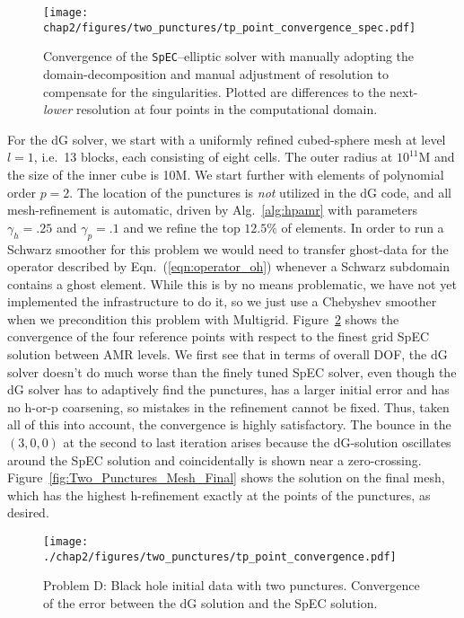  \begin{figure}[ht!]
    \centering
\texttt{[image: chap2/figures/two\_punctures/tp\_point\_convergence\_spec.pdf]}
\caption{
  \label{fig:spec_point_convergence}
  Convergence of the \texttt{SpEC}--elliptic solver with manually
  adopting the domain-decomposition and manual adjustment of
  resolution to compensate for the singularities. Plotted are differences to the
  next-\emph{lower} resolution at four points in the computational domain. }
\end{figure}

For the dG solver, we start with a uniformly refined cubed-sphere mesh
at level $l=1$, i.e.\ 13 blocks, each consisting of eight cells.  The  outer radius at $10^{11}$M and the size of the inner cube is 10M.  We start further with elements of  polynomial
order $p=2$.  The location of the punctures is \textit{not} utilized in the dG code, and all mesh-refinement is automatic, driven by Alg.~\ref{alg:hpamr}  with parameters $\gamma_h = .25$ and $\gamma_p = .1$ and we refine the top $12.5\%$ of elements. In order
to run a Schwarz smoother for this problem we would need to transfer
ghost-data for the operator described by Eqn.~(\ref{eqn:operator_oh})
whenever a Schwarz subdomain contains a ghost element. While this is
by no means problematic, we have not yet implemented the
infrastructure to do it, so we just use a Chebyshev smoother when we
precondition this problem with
Multigrid. Figure~\ref{fig:Two_Punctures_Mesh_Convergence} shows the
convergence of the four reference points with respect to the finest
grid SpEC solution between AMR levels. We first see that in terms of
overall DOF, the dG solver doesn't do much worse than the finely tuned
SpEC solver, even though the dG solver has to adaptively find the
punctures, has a larger initial error and has no h-or-p coarsening, so
mistakes in the refinement cannot be fixed. Thus, taken all of this
into account, the convergence is highly satisfactory.  The bounce
in the $(3,0,0)$ at the second to last iteration arises because the dG-solution oscillates around the SpEC solution and coincidentally is shown near a zero-crossing. Figure~\ref{fig:Two_Punctures_Mesh_Final} shows the solution on the final mesh, which has the highest h-refinement exactly at the points of the punctures, as desired.

\begin{figure}[ht!]
  \centering
  \texttt{[image: ./chap2/figures/two\_punctures/tp\_point\_convergence.pdf]}
  \caption{Problem D: Black hole initial data with two punctures.  Convergence of the error between the dG solution and the SpEC solution.
  }
  \label{fig:Two_Punctures_Mesh_Convergence} 
\end{figure}


